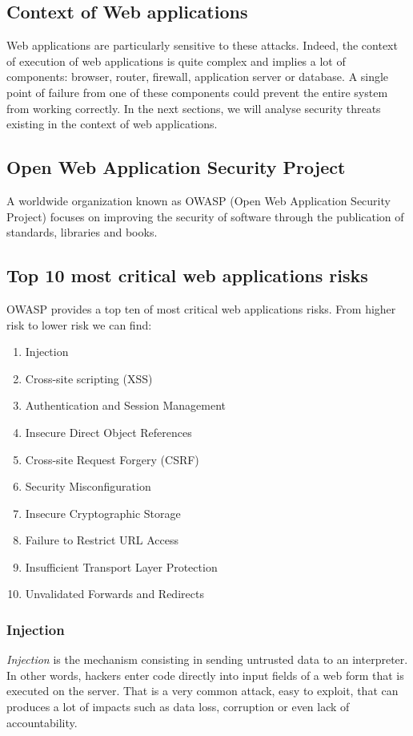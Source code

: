 \subsection{Context of Web applications}
Web applications are particularly sensitive to these attacks. Indeed, the
context of execution of web applications is quite complex and implies a lot of
components: browser, router, firewall, application server or database. A single
point of failure from one of these components could prevent the entire system
from working correctly. In the next sections, we will analyse security threats
existing in the context of web applications.

\subsection{Open Web Application Security Project}
A worldwide organization known as OWASP (Open Web Application Security Project)
focuses on improving the security of software through the publication of
standards, libraries and books.

\subsection{Top 10 most critical web applications risks}
OWASP provides a top ten of most critical web applications risks.
From higher risk to lower risk we can find:
\begin{enumerate}
\item Injection
\item Cross-site scripting (XSS)
\item Authentication and Session Management
\item Insecure Direct Object References
\item Cross-site Request Forgery (CSRF)
\item Security Misconfiguration
\item Insecure Cryptographic Storage
\item Failure to Restrict URL Access
\item Insufficient Transport Layer Protection
\item Unvalidated Forwards and Redirects
\end{enumerate}


\subsubsection{Injection}
\emph{Injection} is the mechanism consisting in sending untrusted data to an
interpreter. In other words, hackers enter code directly into input fields of
a web form that is executed on the server.  That is a very common attack, easy
to exploit, that can produces a lot of impacts such as data loss, corruption
or even lack of accountability.

